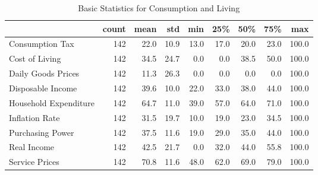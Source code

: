 \documentclass[a4paper,12pt]{article}
\begin{document}
        
        \begin{landscape}
        \begin{table}
\caption{Basic Statistics for Consumption and Living}
\label{tab:statistics_Consumption_and_Living}
\begin{tabular}{lrrrrrrrr}
\toprule
 & count & mean & std & min & 25\% & 50\% & 75\% & max \\
\midrule
Consumption Tax & 142 & 22.0 & 10.9 & 13.0 & 17.0 & 20.0 & 23.0 & 100.0 \\
Cost of Living & 142 & 34.5 & 24.7 & 0.0 & 0.0 & 38.5 & 50.0 & 100.0 \\
Daily Goods Prices & 142 & 11.3 & 26.3 & 0.0 & 0.0 & 0.0 & 0.0 & 100.0 \\
Disposable Income & 142 & 39.6 & 10.0 & 22.0 & 33.0 & 38.0 & 44.0 & 100.0 \\
Household Expenditure & 142 & 64.7 & 11.0 & 39.0 & 57.0 & 64.0 & 71.0 & 100.0 \\
Inflation Rate & 142 & 31.5 & 19.7 & 10.0 & 19.0 & 23.0 & 34.5 & 100.0 \\
Purchasing Power & 142 & 37.5 & 11.6 & 19.0 & 29.0 & 35.0 & 44.0 & 100.0 \\
Real Income & 142 & 42.5 & 21.7 & 0.0 & 32.0 & 44.0 & 55.8 & 100.0 \\
Service Prices & 142 & 70.8 & 11.6 & 48.0 & 62.0 & 69.0 & 79.0 & 100.0 \\
\bottomrule
\end{tabular}
\end{table}

        \end{landscape}
        
        
\end{document}
